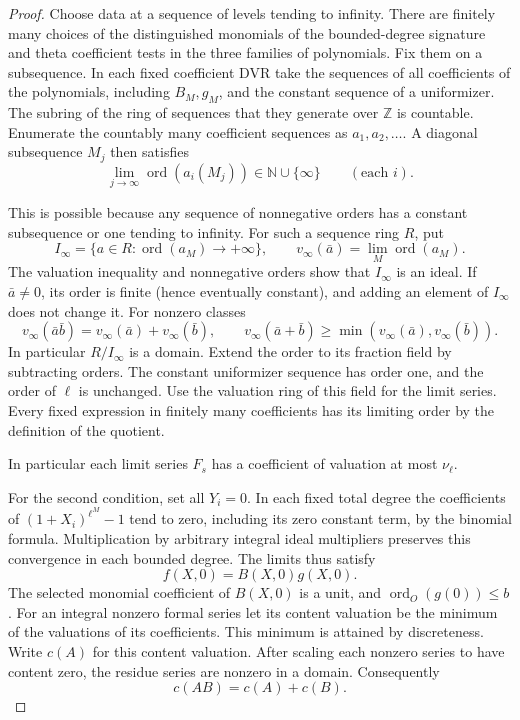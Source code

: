 \begin{proof}
Choose data at a sequence of levels tending to infinity. There
are finitely many choices of the distinguished monomials of the bounded-degree signature and theta coefficient tests in the three families of polynomials. Fix them on a subsequence. In each fixed
coefficient DVR take the sequences of all coefficients of the
polynomials, including \(B_M,g_M\), and the constant sequence
of a uniformizer. The subring of the ring of sequences that
they generate over \(\mathbb Z\) is countable. Enumerate the countably many coefficient sequences as \(a_1,a_2,\ldots\). A diagonal subsequence \(M_j\) then satisfies
\[
 \lim_{j\to\infty}\operatorname{ord}(a_i(M_j))\in\mathbb N\cup\{\infty\}\qquad(\text{each }i).
\]

This is possible because any sequence of nonnegative orders
has a constant subsequence or one tending to infinity.
For such a sequence ring \(R\), put
\[
       I_\infty=\{a\in R:\operatorname{ord}(a_M)\to+\infty\},
       \qquad v_\infty(\bar a)=\lim_M\operatorname{ord}(a_M).
\]
The valuation inequality and nonnegative orders show that
\(I_\infty\) is an ideal. If \(\bar a\ne0\), its order is
finite (hence eventually constant), and adding an element
of \(I_\infty\) does not change it. For nonzero classes
\[
 v_\infty(\bar a\bar b)=v_\infty(\bar a)+v_\infty(\bar b),
 \qquad v_\infty(\bar a+\bar b)\ge
                   \min(v_\infty(\bar a),v_\infty(\bar b)).
\]
In particular \(R/I_\infty\) is a domain. Extend the order
to its fraction field by subtracting orders. The constant
uniformizer sequence has order one, and the order
of \(\ell\) is unchanged. Use the valuation ring of this field
for the limit series. Every fixed expression in finitely many
coefficients has its limiting order by the definition of the
quotient.

In particular each limit series \(F_s\) has a coefficient
of valuation at most \(\nu_\ell\).

For the second condition, set all \(Y_i=0\). In each fixed
total degree the coefficients of \((1+X_i)^{\ell^M}-1\) tend
to zero, including its zero constant term, by the binomial
formula. Multiplication by arbitrary integral ideal multipliers
preserves this convergence in each bounded degree. The limits
thus satisfy
\[
 f(X,0)=B(X,0)g(X,0).
\]
The selected monomial
coefficient of \(B(X,0)\) is a unit, and
\(\operatorname{ord}_O(g(0))\le b\). For an integral nonzero
formal series let its content valuation be the minimum of the
valuations of its coefficients. This minimum is attained by
discreteness. Write \(c(A)\) for this content valuation. After scaling each nonzero series to have content zero, the residue series are nonzero in a domain. Consequently
\[
 c(AB)=c(A)+c(B).
\]


\end{proof}
